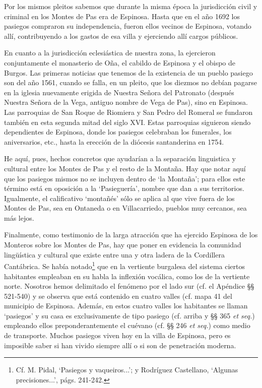 Por los mismos pleitos sabemos que durante la misma época la jurisdicción civil y criminal en los Montes de Pas era de Espinosa. Hasta que en el año 1692 los pasiegos compraron su independencia, fueron ellos vecinos de Espinosa, votando allí, contribuyendo a los gastos de esa villa y ejerciendo allí cargos públicos.

En cuanto a la jurisdicción eclesiástica de nuestra zona, la ejercieron conjuntamente el monasterio de Oña, el cabildo de Espinosa y el obispo de Burgos. Las primeras noticias que tenemos de la existencia de un pueblo pasiego son del año 1561, cuando se falla, en un pleito, que los diezmos no debían pagarse en la iglesia nuevamente erigida de Nuestra Señora del Patronato (después Nuestra Señora de la Vega, antiguo nombre de Vega de Pas), sino en Espinosa. Las parroquias de San Roque de Riomiera y San Pedro del Romeral se fundaron también en esta segunda mitad del siglo XVI. Estas parroquias siguieron siendo dependientes de Espinosa, donde los pasiegos celebraban los funerales, los aniversarios, etc., hasta la erección de la diócesis santanderina en 1754.

He aquí, pues, hechos concretos que ayudarían a la separación linguistica y cultural entre los Montes de Pas y el resto de la Montaña. Hay que notar aquí que los pasiegos mismos no se incluyen dentro de `la Montaña'; para ellos este término está en oposición a la `Pasieguería', nombre que dan a sus territorios. Igualmente, el calificativo `montañés' sólo se aplica al que vive fuera de los Montes de Pas, sea en Ontaneda o en Villacarriedo, pueblos muy cercanos, sea más lejos.

Finalmente, como testimonio de la larga atracción que ha ejercido Espinosa de los Monteros sobre los Montes de Pas, hay que poner en evidencia la comunidad lingüística y cultural que existe entre una y otra ladera de la Cordillera Cantábrica. Se había notado\footnote{Cf. M. Pidal, `Pasiegos y vaqueiros...'; y Rodríguez Castellano, `Algunas precisiones...', págs. 241-242.} que en la vertiente burgalesa del sistema ciertos habitantes empleaban en su habla la inflexión vocálica, como los de la vertiente norte. Nosotros hemos delimitado el fenómeno por el lado sur (cf. el Apéndice §§ 521-540) y se observa que está contenido en cuatro valles (cf. mapa 41 del municipio
de Espinosa. Además, en estos cuatro valles los habitantes se llaman `pasiegos' y su casa es exclusivamente de tipo pasiego (cf. arriba y §§ 365 \emph{et seq.}) empleando ellos preponderantemente el cuévano (cf. §§ 246 \emph{et seq.}) como medio de transporte. Muchos pasiegos viven hoy en la villa de Espinosa, pero es imposible saber si han vivido siempre allí o si son de penetración moderna.

